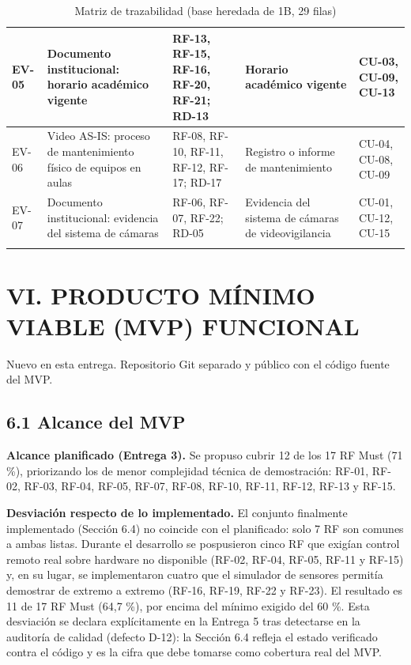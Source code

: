 \begin{longtable}{|p{3.1cm}|p{3.1cm}|p{3.1cm}|p{3.1cm}|p{3.1cm}|}
EV-05 & Documento institucional: horario académico vigente & RF-13, RF-15, RF-16, RF-20, RF-21; RD-13 & Horario académico vigente & CU-03, CU-09, CU-13 \\ \hline
EV-06 & Video AS-IS: proceso de mantenimiento físico de equipos en aulas & RF-08, RF-10, RF-11, RF-12, RF-17; RD-17 & Registro o informe de mantenimiento & CU-04, CU-08, CU-09 \\ \hline
EV-07 & Documento institucional: evidencia del sistema de cámaras & RF-06, RF-07, RF-22; RD-05 & Evidencia del sistema de cámaras de videovigilancia & CU-01, CU-12, CU-15 \\ \hline
\caption{Matriz de trazabilidad (base heredada de 1B, 29 filas)}
\end{longtable}
\endgroup

\section*{VI. PRODUCTO MÍNIMO VIABLE (MVP) FUNCIONAL}


Nuevo en esta entrega. Repositorio Git separado y público con el código fuente del MVP.


\subsection*{6.1 Alcance del MVP}


\textbf{Alcance planificado (Entrega 3).} Se propuso cubrir 12 de los 17 RF Must (71 \%), priorizando los de menor complejidad técnica de demostración: RF-01, RF-02, RF-03, RF-04, RF-05, RF-07, RF-08, RF-10, RF-11, RF-12, RF-13 y RF-15.

\textbf{Desviación respecto de lo implementado.} El conjunto finalmente implementado (Sección 6.4) no coincide con el planificado: solo 7 RF son comunes a ambas listas. Durante el desarrollo se pospusieron cinco RF que exigían control remoto real sobre hardware no disponible (RF-02, RF-04, RF-05, RF-11 y RF-15) y, en su lugar, se implementaron cuatro que el simulador de sensores permitía demostrar de extremo a extremo (RF-16, RF-19, RF-22 y RF-23). El resultado es 11 de 17 RF Must (64,7 \%), por encima del mínimo exigido del 60 \%. Esta desviación se declara explícitamente en la Entrega 5 tras detectarse en la auditoría de calidad (defecto D-12): la Sección 6.4 refleja el estado verificado contra el código y es la cifra que debe tomarse como cobertura real del MVP.


